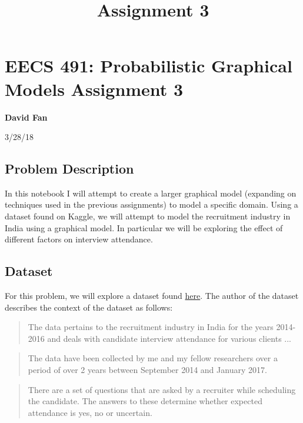 \documentclass[11pt]{article}
\title{Assignment 3}
\begin{document}
    
    
    \maketitle
    
    

    
    \section{EECS 491: Probabilistic Graphical Models Assignment
3}\label{eecs-491-probabilistic-graphical-models-assignment-3}

\textbf{David Fan}

3/28/18

    \subsection{Problem Description}\label{problem-description}

In this notebook I will attempt to create a larger graphical model
(expanding on techniques used in the previous assignments) to model a
specific domain. Using a dataset found on Kaggle, we will attempt to
model the recruitment industry in India using a graphical model. In
particular we will be exploring the effect of different factors on
interview attendance.

    \subsection{Dataset}\label{dataset}

For this problem, we will explore a dataset found
\href{https://www.kaggle.com/vishnusraghavan/the-interview-attendance-problem/data}{here}.
The author of the dataset describes the context of the dataset as
follows:

\begin{quote}
The data pertains to the recruitment industry in India for the years
2014-2016 and deals with candidate interview attendance for various
clients ...
\end{quote}

\begin{quote}
The data have been collected by me and my fellow researchers over a
period of over 2 years between September 2014 and January 2017.
\end{quote}

\begin{quote}
There are a set of questions that are asked by a recruiter while
scheduling the candidate. The answers to these determine whether
expected attendance is yes, no or uncertain.
\end{quote}
\end{document}
